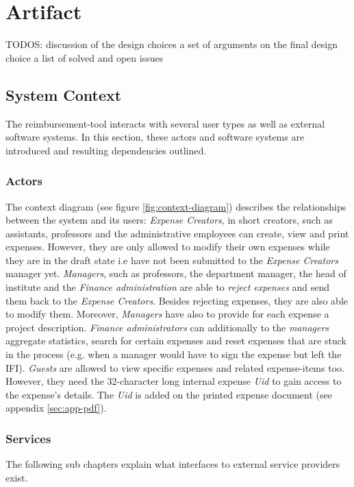 \chapter{Artifact}

TODOS:
discussion of the design choices  a set of arguments on the final design choice
a list of solved and open issues




\section{System Context}

The reimbursement-tool interacts with several user types as well as external software systems. In this section, these actors and software systems are introduced and resulting dependencies outlined.

\subsection{Actors}

The context diagram (see figure \ref{fig:context-diagram}) describes the relationships between the system and its users:
\textit{Expense Creators}, in short creators, such as assistants, professors and the administrative employees can create, view and print expenses. However, they are only allowed to modify their own expenses while they are in the draft state i.e have not been submitted to the \textit{Expense Creators} manager yet.  \textit{Managers}, such as professors, the department manager, the head of institute and the \textit{Finance administration} are able to \textit{reject expenses} and send them back to the \textit{Expense Creators}. Besides rejecting expenses, they are also able to modify them. Moreover, \textit{Managers} have also to provide for each expense a project description. \textit{Finance administrators} can additionally to the \textit{managers} aggregate statistics, search for certain expenses and reset expenses that are stuck in the process (e.g. when a manager would have to sign the expense but left the IFI). \textit{Guests} are allowed to view specific expenses and related expense-items too. However, they need the 32-character long internal expense \textit{Uid} to gain access to the expense's details. The \textit{Uid} is added on the printed expense document (see appendix \ref{sec:app-pdf}).

\subsection{Services}
The following sub chapters explain what interfaces to external service providers exist.

